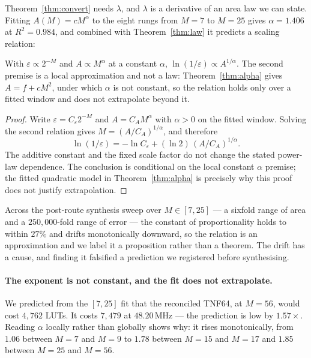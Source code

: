 Theorem~\ref{thm:convert} needs $\lambda$, and $\lambda$ is a derivative of an
area law we can state. Fitting $A(M) = cM^{\alpha}$ to the eight rungs from
$M{=}7$ to $M{=}25$ gives $\alpha = 1.406$ at $R^2 = 0.984$, and combined with
Theorem~\ref{thm:law} it predicts a scaling relation:

\begin{proposition}
\label{prop:stretched}
With $\varepsilon \propto 2^{-M}$ and $A \propto M^{\alpha}$ at a constant
$\alpha$, $\ln(1/\varepsilon) \propto A^{1/\alpha}$. The second premise is a local
approximation and not a law: Theorem~\ref{thm:alpha} gives $A = f + cM^{2}$, under
which $\alpha$ is not constant, so the relation holds only over a fitted window and
does not extrapolate beyond it.
\end{proposition}
\begin{proof}
Write $\varepsilon=C_{\varepsilon}2^{-M}$ and
$A=C_A M^{\alpha}$ with $\alpha>0$ on the fitted window.  Solving the
second relation gives $M=(A/C_A)^{1/\alpha}$, and therefore
\[
 \ln(1/\varepsilon)
 =-\ln C_{\varepsilon}+(\ln 2)\,(A/C_A)^{1/\alpha}.
\]
The additive constant and the fixed scale factor do not change the stated
power-law dependence.  The conclusion is conditional on the local constant
$\alpha$ premise; the fitted quadratic model in Theorem~\ref{thm:alpha}
is precisely why this proof does not justify extrapolation.
\end{proof}

Across the post-route synthesis sweep over $M \in [7,25]$ --- a sixfold range of area and a $250{,}000$-fold
range of error --- the constant of proportionality holds to within $27\%$ and
drifts monotonically downward, so the relation is an approximation and we label
it a proposition rather than a theorem. The drift has a cause, and finding it
falsified a prediction we registered before synthesising.

\paragraph{The exponent is not constant, and the fit does not extrapolate.} We
predicted from the $[7,25]$ fit that the reconciled TNF64, at $M = 56$, would
cost $4{,}762$ LUTs. It costs $7{,}479$ at $48.20$\,MHz --- the prediction is low
by $1.57\times$. Reading $\alpha$ locally rather than globally shows why: it rises
monotonically, from $1.06$ between $M{=}7$ and $M{=}9$ to $1.78$ between $M{=}15$
and $M{=}17$ and $1.85$ between $M{=}25$ and $M{=}56$.

